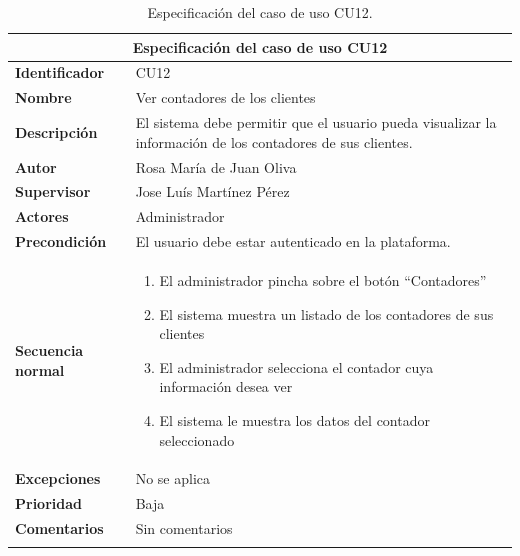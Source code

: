 \documentclass[pdftex,11pt,a4paper]{book}
\begin{document}

\renewcommand{\tablename}{Tabla}
\renewcommand{\arraystretch}{1,7}

\begin{center}
\begin{longtable}{|m{}|m{11cm}|}
\hline
\multicolumn{2}{|c|}{\textbf{Especificación del caso de uso CU12}}\\
\hline 
\endhead

\textbf{Identificador} & CU12  
\\ \hline
\textbf{Nombre} & Ver contadores de los clientes
\\ \hline
\textbf{Descripción} & El sistema debe permitir que el usuario pueda visualizar la información de los contadores de sus clientes.
\\ \hline
\textbf{Autor} & Rosa María de Juan Oliva 
\\ \hline
\textbf{Supervisor} & Jose Luís Martínez Pérez  
\\ \hline
\textbf{Actores} & Administrador 
\\ \hline
\textbf{Precondición} & El usuario debe estar autenticado en la plataforma.
\\ \hline
\textbf{Secuencia normal} & 
\begin{enumerate}
\addtolength{\itemsep}{-3mm}
\item El administrador pincha sobre el botón “Contadores”
\item El sistema muestra un listado de los contadores de sus clientes
\item El administrador selecciona el contador cuya información desea ver
\item El sistema le muestra los datos del contador seleccionado
\end{enumerate}
\\ \hline
\textbf{Excepciones} & No se aplica
\\ \hline
\textbf{Prioridad} & Baja
\\ \hline
\textbf{Comentarios} & Sin comentarios
\\ \hline

\caption{Especificación del caso de uso CU12.} \label{tablalarga:tablaCU12}
\end{longtable}
\end{center}


\renewcommand{\tablename}{Tabla}
\renewcommand{\arraystretch}{1,7}
\end{document}
